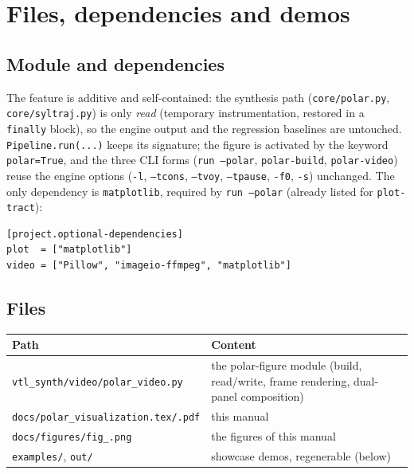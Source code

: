 \documentclass[11pt,a4paper]{article}
\newcommand{\code}[1]{\texttt{#1}}
\begin{document}
\section{Files, dependencies and demos}

\subsection{Module and dependencies}

The feature is additive and self-contained: the synthesis path
(\code{core/polar.py}, \code{core/syltraj.py}) is only \emph{read}
(temporary instrumentation, restored in a \code{finally} block), so
the engine output and the regression baselines are untouched.
\code{Pipeline.run(...)} keeps its signature; the figure is activated
by the keyword \code{polar=True}, and the three CLI forms
(\code{run --polar}, \code{polar-build}, \code{polar-video}) reuse the
engine options (\code{-l}, \code{--tcons}, \code{--tvoy},
\code{--tpause}, \code{-f0}, \code{-s}) unchanged. The only
dependency is \code{matplotlib}, required by \code{run --polar}
(already listed for \code{plot-tract}):

\begin{lstlisting}[style=json]
[project.optional-dependencies]
plot  = ["matplotlib"]
video = ["Pillow", "imageio-ffmpeg", "matplotlib"]
\end{lstlisting}

\subsection{Files}

\begin{center}
\begin{tabularx}{\textwidth}{@{}lX@{}}
\toprule
\textbf{Path} & \textbf{Content} \\
\midrule
\code{vtl\_synth/video/polar\_video.py} & the polar-figure module
(build, read/write, frame rendering, dual-panel composition) \\
\code{docs/polar\_visualization.tex/.pdf} & this manual \\
\code{docs/figures/fig\_\*.png} & the figures of this manual \\
\code{examples/}, \code{out/} & showcase demos, regenerable (below) \\
\bottomrule
\end{tabularx}
\end{center}
\end{document}
